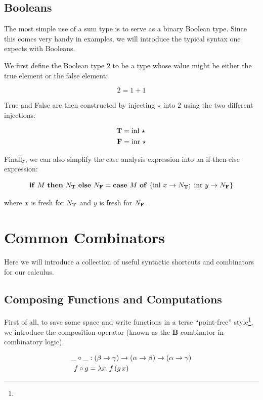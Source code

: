 \subsection{Booleans}

The most simple use of a sum type is to serve as a binary Boolean
type. Since this comes very handy in examples, we will introduce the
typical syntax one expects with Booleans.

We first define the Boolean type $2$ to be a type whose value might be
either the true element or the false element:

$$
2 = 1 + 1
$$

True and False are then constructed by injecting $\star$ into $2$ using the
two different injections:

\begin{align*}
  \textbf{T} &= \operatorname{inl}\,\star \\
  \textbf{F} &= \operatorname{inr}\,\star
\end{align*}

Finally, we can also simplify the case analysis expression into an
if-then-else expression:

$$
\text{\textbf{if} $M$ \textbf{then} $N_{\textbf{T}}$ \textbf{else} $N_{\textbf{F}}$} = \text{\textbf{case} $M$ \textbf{of} $\{ \operatorname{inl}\,x \to N_{\textbf{T}};\ \operatorname{inr}\,y \to N_{\textbf{F}} \}$}
$$

where $x$ is fresh for $N_{\textbf{T}}$ and $y$ is fresh for $N_{\textbf{F}}$.

\section{Common Combinators}

Here we will introduce a collection of useful syntactic shortcuts and
combinators for our calculus.

\subsection{Composing Functions and Computations}
\label{ssec:composing-functions}

First of all, to save some space and write functions in a terse
``point-free'' style\footnote{}, we introduce the composition
operator (known as the $\textbf{B}$ combinator in combinatory logic).

\begin{align*}
  \_ \circ \_ &: (\beta \to \gamma) \to (\alpha \to \beta) \to (\alpha \to \gamma) \\
  f \circ g &= \lambda x.\, f\,(g\,x)
\end{align*}

